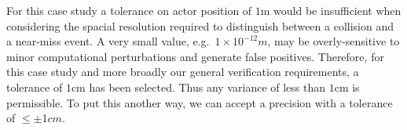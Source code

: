 \documentclass[letterpaper, 10 pt, journal, twoside]{IEEEtran}
\begin{document}
%
% 

%
For this case study a tolerance on actor position of $1$m would be insufficient when considering the spacial resolution required to distinguish between a collision and a near-miss event. 
A very small value, e.g.\ $1\times10^{-12}m$, may be overly-sensitive to minor computational perturbations and generate false positives. 
Therefore, for this case study and more broadly our general verification requirements, a tolerance of $1$cm has been selected. 
Thus any variance of less than $1$cm is permissible. To put this another way, we can accept a precision with a tolerance of $\leq$$\pm$1$cm$. 


%


\end{document}
